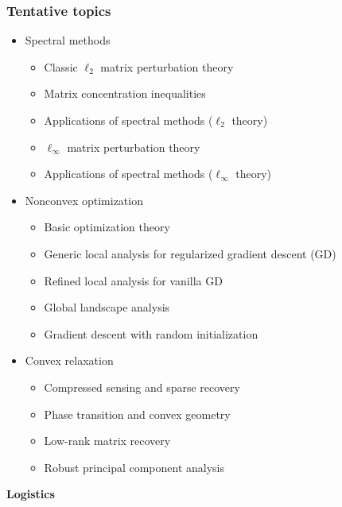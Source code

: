 \documentclass[compress,
mathserif,wide,%
]{beamer}
\begin{document}
\begin{frame}
\frametitle{Tentative topics}

\begin{itemize}
  \item Spectral methods
    \begin{itemize}
      \item Classic $\ell_2$ matrix perturbation theory
      \item Matrix concentration inequalities
      \item Applications of spectral methods ($\ell_2$ theory)
      \item $\ell_{\infty}$ matrix perturbation theory
      \item Applications of spectral methods ($\ell_{\infty}$ theory)
    \end{itemize}
  \item Nonconvex optimization
    \begin{itemize}
      \item Basic optimization theory
      \item Generic local analysis for regularized gradient descent (GD)
      \item Refined local analysis for vanilla GD
      \item Global landscape analysis
      \item Gradient descent with random initialization
    \end{itemize}
  \item Convex relaxation
    \begin{itemize}
      \item Compressed sensing and sparse recovery
      \item Phase transition and convex geometry
      \item Low-rank matrix recovery
      \item Robust principal component analysis
    \end{itemize}
\end{itemize}

\end{frame}




\begin{frame}[plain]

\vfill
\begin{center}
  {\Large\bf Logistics}
\end{center}
\vfill

\end{frame}
\end{document}
